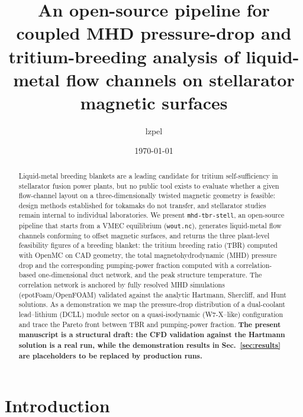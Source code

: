 \documentclass{article}
\title{An open-source pipeline for coupled MHD pressure-drop and tritium-breeding
analysis of liquid-metal flow channels on stellarator magnetic surfaces}
\author{lzpel}
\date{\today}
\begin{document}
\maketitle

\begin{center}
\end{center}

\begin{abstract}
Liquid-metal breeding blankets are a leading candidate for tritium self-sufficiency
in stellarator fusion power plants, but no public tool exists to evaluate whether a
given flow-channel layout on a three-dimensionally twisted magnetic geometry is
feasible: design methods established for tokamaks do not transfer, and stellarator
studies remain internal to individual laboratories. We present \texttt{mhd-tbr-stell},
an open-source pipeline that starts from a VMEC equilibrium (\texttt{wout.nc}),
generates liquid-metal flow channels conforming to offset magnetic surfaces, and
returns the three plant-level feasibility figures of a breeding blanket: the tritium
breeding ratio (TBR) computed with OpenMC on CAD geometry, the total
magnetohydrodynamic (MHD) pressure drop and the corresponding pumping-power fraction
computed with a correlation-based one-dimensional duct network, and the peak
structure temperature. The correlation network is anchored by fully resolved MHD
simulations (epotFoam/OpenFOAM) validated against the analytic Hartmann, Shercliff,
and Hunt solutions. As a demonstration we map the pressure-drop distribution of a
dual-coolant lead--lithium (DCLL) module sector on a quasi-isodynamic
(W7-X--like) configuration and trace the Pareto front between TBR and pumping-power
fraction. \textbf{The present manuscript is a structural draft: the CFD
validation against the Hartmann solution is a real run, while the demonstration
results in Sec.~\ref{sec:results} are placeholders to be replaced by production runs.}
\end{abstract}

\section{Introduction}
\end{document}
